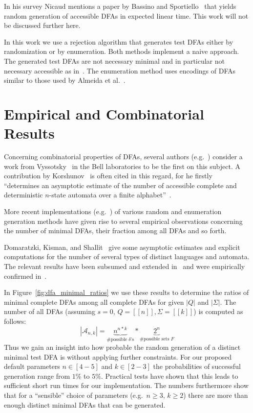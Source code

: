 In his survey Nicaud mentions a paper by Bassino and Sportiello~\cite{BS13} that yields random generation of accessible DFAs in expected linear time. This work will not be discussed further here.

In this work we use a rejection algorithm that generates test DFAs either by randomization or by enumeration. Both methods implement a naive approach. The generated test DFAs are not necessary minimal and in particular not necessary accessible as in~\cite{CN12}. The enumeration method uses encodings of DFAs similar to those used by Almeida et al.~\cite{RMA05}.


\section{Empirical and Combinatorial Results}

Concerning combinatorial properties of DFAs, several authors (e.g.~\cite{BN07, DKS02, HJ14}) consider a work from Vyssotsky~\cite{Vys59} in the Bell laboratories to be the first on this subject. A contribution by Korshunov~\cite{Kor78} is often cited in this regard, for he firstly ``determines an asymptotic estimate of the number of accessible complete and deterministic $n$-state automata over a finite alphabet''~\cite{BDS11}.

More recent implementations (e.g.~\cite{AAA09, BDN07}) of various random and enumeration generation methods have given rise to several empirical observations concerning the number of minimal DFAs, their fraction among all DFAs and so forth.

Domaratzki, Kisman, and Shallit~\cite{DKS02} give some asymptotic estimates and explicit computations for the number of several types of distinct languages and automata. The relevant results have been subsumed and extended in~\cite[p. 8]{AMR09} and were empirically confirmed in~\cite{BDN07}.

In Figure~\ref{fig:dfa_minimal_ratios} we use these results to determine the ratios of minimal complete DFAs among all complete DFAs for given $|Q|$ and $|\Sigma|$. The number of all DFAs (assuming $s=0$, $Q=[[n]], \Sigma=[[k]]$) is computed as follows:
\[
|\mathcal{A}_{n,k}| = \underbrace{n^{n*k}}_{\#\text{possible }\delta\text{'s}} * \underbrace{2^n}_{\#\text{possible sets }F}
\]
Thus we gain an insight into how probable the random generation of a distinct minimal test DFA is without applying further constraints. For our proposed default parameters $n\in[4-5]$ and $k\in[2-3]$ the probabilities of successful generation range from $1\%$ to $5\%$. Practical tests have shown that this leads to sufficient short run times for our implementation. The numbers furthermore show that for a ``sensible'' choice of parameters (e.g.\ $n \ge 3$, $k\ge 2$) there are more than enough distinct minimal DFAs that can be generated. 

